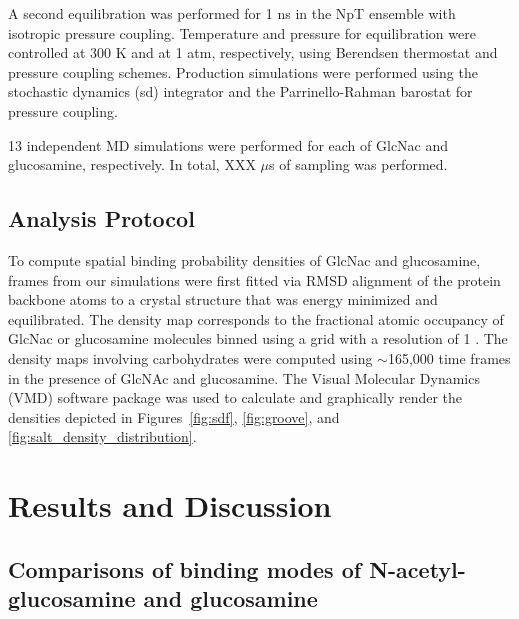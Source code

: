 A second equilibration was performed for 1 ns in the NpT ensemble with isotropic pressure coupling. Temperature and pressure for equilibration were controlled at 300 K and at 1 atm, respectively, using Berendsen thermostat and pressure coupling schemes. Production simulations were performed using the stochastic dynamics (sd) integrator and the Parrinello-Rahman barostat for pressure coupling.

13 independent MD simulations were performed for each of GlcNac and glucosamine, respectively. In total, XXX $\mu$s of sampling was performed.

\subsection*{Analysis Protocol}
To compute spatial binding probability densities of GlcNac and glucosamine, frames from our simulations were first fitted via RMSD alignment of the protein backbone atoms to a crystal structure that was energy minimized and equilibrated. The density map corresponds to the fractional atomic occupancy of GlcNac or glucosamine molecules binned using a grid with a resolution of 1 \angstrom.  The density maps involving carbohydrates were computed using $\sim$165,000 time frames in the presence of GlcNAc and glucosamine. The Visual Molecular Dynamics (VMD) software package\cite{Humphrey:1996to} was used to calculate and graphically render the densities depicted in Figures~\ref{fig:sdf}, \ref{fig:groove}, and \ref{fig:salt_density_distribution}.

\section{Results and Discussion}


\subsection{Comparisons of binding modes of N-acetyl-glucosamine and glucosamine}

